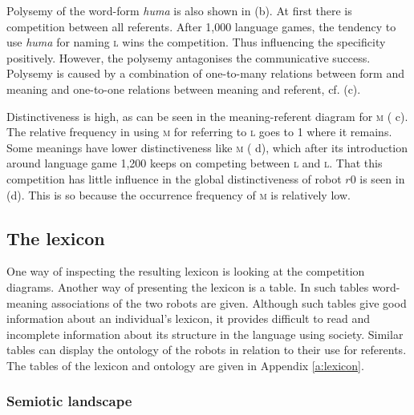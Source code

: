 Polysemy of the word-form {\it huma} is also shown in  (b). At first there is competition between all referents. After 1,000 language games, the tendency to use {\it huma} for naming {\scshape l} wins the competition. Thus influencing the specificity positively. However, the polysemy antagonises the communicative success. Polysemy is caused by a combination of one-to-many relations between form and meaning and one-to-one relations between meaning and referent, cf.  (c).

Distinctiveness is high, as can be seen in the meaning-referent diagram for {\scshape m} ( c). The relative frequency in using {\scshape m} for referring to {\scshape l} goes to 1 where it remains. Some meanings have lower distinctiveness like {\scshape m} ( d), which after its introduction around language game 1,200 keeps on competing between {\scshape l} and {\scshape l}. That this competition has little influence in the global distinctiveness of robot $r0$ is seen in  (d). This is so because the occurrence frequency of {\scshape m} is relatively low.

\subsection{The lexicon}

One way of inspecting the resulting lexicon is looking at the competition diagrams. Another way of presenting the lexicon is a table. In such tables word-meaning associations of the two robots are given. Although such tables give good information about an individual's lexicon, it provides difficult to read and incomplete information about its structure in the language using society. Similar tables can display the ontology of the robots in relation to their use for referents. The tables of the lexicon and ontology are given in Appendix \ref{a:lexicon}.

\subsubsection{Semiotic landscape}


